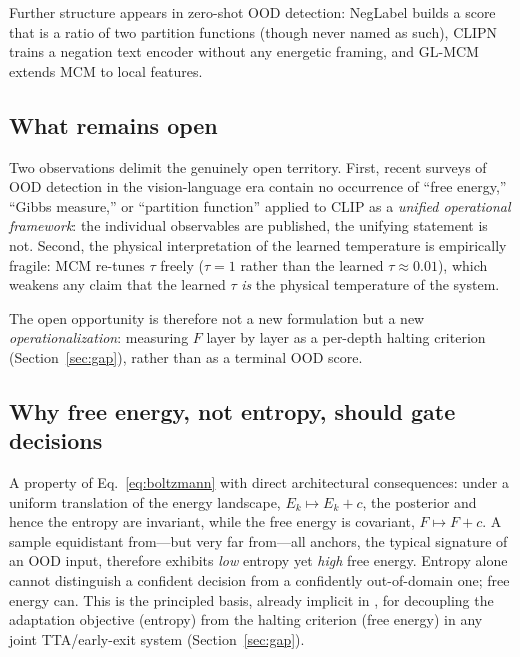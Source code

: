 \documentclass[preprint,12pt]{elsarticle}
\begin{document}
Further structure appears in zero-shot OOD detection: NegLabel \citep{jiang2024neglabel} builds a score that is a ratio of two partition functions (though never named as such), CLIPN \citep{wang2023clipn} trains a negation text encoder without any energetic framing, and GL-MCM \citep{miyai2025glmcm} extends MCM to local features.

\subsection{What remains open}

Two observations delimit the genuinely open territory. First, recent surveys of OOD detection in the vision-language era contain no occurrence of ``free energy,'' ``Gibbs measure,'' or ``partition function'' applied to CLIP as a \emph{unified operational framework}: the individual observables are published, the unifying statement is not. Second, the physical interpretation of the learned temperature is empirically fragile: MCM re-tunes $\tau$ freely ($\tau = 1$ rather than the learned $\tau \approx 0.01$), which weakens any claim that the learned $\tau$ \emph{is} the physical temperature of the system.

The open opportunity is therefore not a new formulation but a new \emph{operationalization}: measuring $F$ layer by layer as a per-depth halting criterion (Section~\ref{sec:gap}), rather than as a terminal OOD score.

\subsection{Why free energy, not entropy, should gate decisions}

A property of Eq.~\eqref{eq:boltzmann} with direct architectural consequences: under a uniform translation of the energy landscape, $E_k \mapsto E_k + c$, the posterior and hence the entropy are invariant, while the free energy is covariant, $F \mapsto F + c$. A sample equidistant from---but very far from---all anchors, the typical signature of an OOD input, therefore exhibits \emph{low} entropy yet \emph{high} free energy. Entropy alone cannot distinguish a confident decision from a confidently out-of-domain one; free energy can. This is the principled basis, already implicit in \citet{liu2020energy}, for decoupling the adaptation objective (entropy) from the halting criterion (free energy) in any joint TTA/early-exit system (Section~\ref{sec:gap}).

\end{document}
